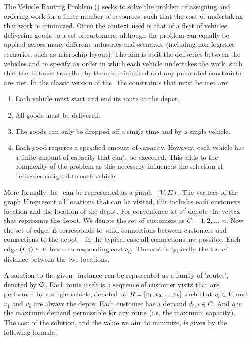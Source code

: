 The Vehicle Routing Problem (\VRP) seeks to solve the problem of assigning and ordering work for a finite number of resources, such that the cost of undertaking that work is minimized. Often the context used is that of a fleet of vehicles delivering goods to a set of customers, although the problem can equally be applied across many different industries and scenarios (including non-logistics scenarios, such as microchip layout). The aim is split the deliveries between the vehicles and to specify an order in which each vehicle undertakes the work, such that the distance travelled by them is minimized and any pre-stated constraints are met. In the classic version of the \VRP\ the constraints that must be met are: 

\begin{enumerate}
   \item Each vehicle must start and end its route at the depot.
   \item All goods must be delivered.
   \item The goods can only be dropped off a single time and by a single vehicle.
   \item Each good requires a specified amount of capacity. However, each vehicle has a finite amount of capacity that can't be exceeded. This adds to the complexity of the problem as this necessary influences the selection of deliveries assigned to each vehicle.
\end{enumerate}


More formally the \VRP\ can be represented as a graph $(V,E)$. The vertices of the graph $V$ represent all locations that can be visited, this includes each customers location and the location of the depot. For convenience let $v^d$ denote the vertex that represents the depot. We denote the set of customers as $C = 1,2,...,n$. Now the set of edges $E$ corresponds to valid connections between customers and connections to the depot -- in the typical case all connections are possible. Each edge $(i,j) \in E$ has a corresponding cost $c_{ij}$. The cost is typically the travel distance between the two locations.

A solution to the given \VRP\ instance can be represented as a family of 'routes', denoted by $\mathfrak{S}$. Each route itself is a sequence of customer visits that are performed by a single vehicle, denoted by $R = [v_1, v_2,..., v_k]$ such that $v_i \in V$, and $v_1$ and $v_k$ are always the depot. Each customer has a demand $d_i, i \in C$. And $q$ is the maximum demand permissible for any route (i.e. the maximum capacity). The cost of the solution, and the value we aim to minimize, is given by the following formula:

